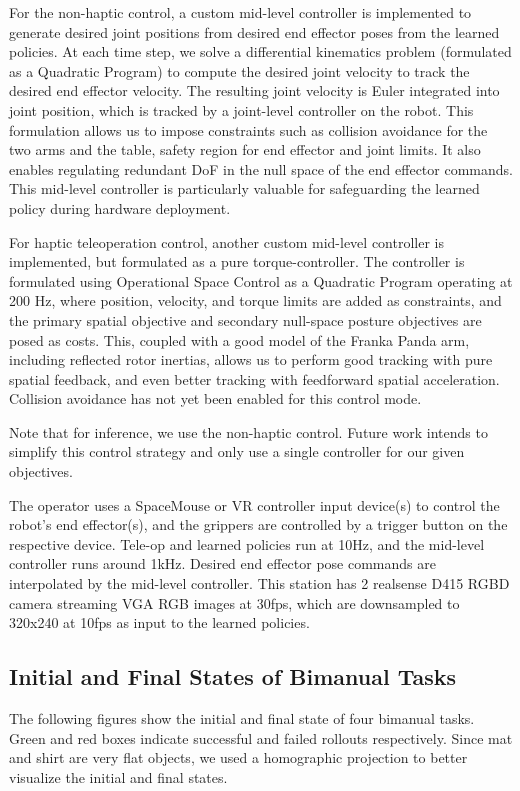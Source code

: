 \documentclass[Afour,sageh,times]{sagej}
\begin{document}
For the non-haptic control, a custom mid-level controller is implemented to generate desired joint positions from desired end effector poses from the learned policies. At each time step, we solve a differential kinematics problem (formulated as a Quadratic Program) to compute the desired joint velocity to track the desired end effector velocity. The resulting joint velocity is Euler integrated into joint position, which is tracked by a joint-level controller on the robot. This formulation allows us to impose constraints such as collision avoidance for the two arms and the table, safety region for end effector and joint limits. It also enables regulating redundant DoF in the null space of the end effector commands. This mid-level controller is particularly valuable for safeguarding the learned policy during hardware deployment.

For haptic teleoperation control, another custom mid-level controller is implemented, but formulated as a pure torque-controller. The controller is formulated using Operational Space Control \citet{khatib1987osc} as a Quadratic Program operating at 200 Hz, where position, velocity, and torque limits are added as constraints, and the primary spatial objective and secondary null-space posture objectives are posed as costs.
This, coupled with a good model of the Franka Panda arm, including reflected rotor inertias, allows us to perform
good tracking with pure spatial feedback, and even better tracking with feedforward spatial acceleration.
Collision avoidance has not yet been enabled for this control mode.

Note that for inference, we use the non-haptic control. Future work intends to simplify
this control strategy and only use a single controller for our given objectives.

The operator uses a SpaceMouse or VR controller input device(s) to control the robot's end effector(s), and the grippers are controlled by a trigger button on the respective device. Tele-op and learned policies run at 10Hz, and the mid-level controller runs around 1kHz. Desired end effector pose commands are interpolated by the mid-level controller. This station has 2 realsense D415 RGBD camera streaming VGA RGB images at 30fps, which are downsampled to 320x240 at 10fps as input to the learned policies.

\subsection{Initial and Final States of Bimanual Tasks}
\label{sec:bimanual_ini_fial}
The following figures show the initial and final state of four bimanual tasks. Green and red boxes indicate successful and failed rollouts respectively. Since mat and shirt are very flat objects, we used a homographic projection to better visualize the initial and final states.
\end{document}
